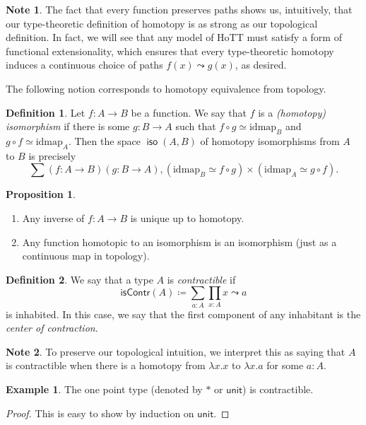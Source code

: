 \documentclass[10pt,letterpaper,cm]{nupset}
\theoremstyle{definition}
\newtheorem*{definition}{Definition}
\newtheorem{exmp}{Example}
\newtheorem{note}{Note}
\newtheorem{prop}{Proposition}
\newcommand{\1}{\mathbf{1}}
\newcommand{\0}{\vec 0}
\DeclareMathOperator{\iso}{\mathsf{iso}}
\begin{document}
\begin{note}
The fact that every function preserves paths shows us, intuitively, that our type-theoretic definition of homotopy is as strong as our topological definition. In fact, we will see that any model of HoTT must satisfy a form of functional extensionality, which ensures that every type-theoretic homotopy induces a continuous choice of paths $f(x) \leadsto g(x)$, as desired.
\end{note}

The following notion corresponds to homotopy equivalence from topology.

\begin{definition}
Let $f: A \to B$ be a function. We say that $f$ is a \textit{(homotopy) isomorphism} if there is some $g:  B \to A$ such that $f \circ g \simeq \text{idmap}_B$ and $g\circ f \simeq \text{idmap}_A$. Then the space $\iso(A,B)$ of homotopy isomorphisms from $A$ to $B$ is precisely $$\sum(f:A\to B)(g:B \to A), (\text{idmap}_B \simeq f\circ g) \times  (\text{idmap}_A \simeq g\circ f).$$
\end{definition}

\begin{prop} $ $
\begin{enumerate}
\item Any inverse of $f: A \to B$ is unique up to homotopy. 
\item  Any function homotopic to an isomorphism is an isomorphism (just as a continuous map in topology).
\end{enumerate}
\end{prop}

\begin{definition}
We say that a type $A$ is \textit{contractible} if 
\[
\mathsf{isContr}(A)\coloneqq \sum_{a:A}\prod_{x:A}x \leadsto a
\] is inhabited. In this case, we say that the first component of any inhabitant is the \textit{center of contraction}.
\end{definition}
\begin{note}
To preserve our topological intuition, we interpret this as saying that $A$ is contractible when there is a homotopy from $\lambda x.x$ to $\lambda x.a$ for some $a:A$.
\end{note}

\begin{exmp}
The one point type (denoted by $\ast$ or $\mathsf{unit}$) is contractible.
\end{exmp}
\begin{proof}
This is easy to show by induction on $\mathsf{unit}$.
\end{proof}
\end{document}
